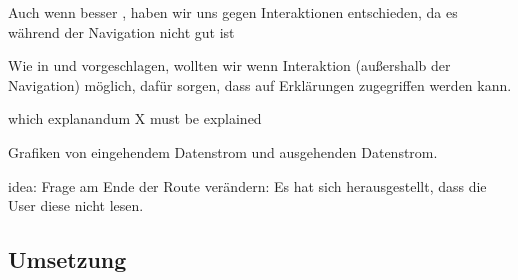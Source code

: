 Auch wenn besser \cite{riveiro_thats_2021}, haben wir uns gegen Interaktionen entschieden, da es während der Navigation nicht gut ist

Wie in \cite{chazette_end-users_nodate} und \cite{wang_integration_2020} vorgeschlagen, wollten wir wenn Interaktion (außershalb der Navigation) möglich, dafür sorgen, dass auf Erklärungen zugegriffen werden kann.

which explanandum X must be explained \cite{kohl_explainability_2019}

Grafiken von eingehendem Datenstrom und ausgehenden Datenstrom.

idea: Frage am Ende der Route verändern: Es hat sich herausgestellt, dass die User diese nicht lesen.

\subsection{Umsetzung}